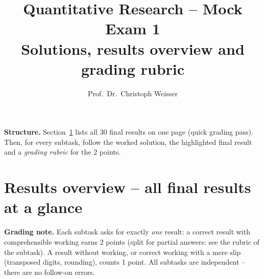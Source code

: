 \documentclass[11pt]{article}
\title{\vspace{-1.2cm}\textbf{Quantitative Research -- Mock Exam 1}\\[2pt]
\large Solutions, results overview and grading rubric}
\author{Prof.\ Dr.\ Christoph Weisser}
\date{}
\begin{document}
\maketitle
\thispagestyle{fancy}
\vspace{-0.7cm}

\noindent\small\textbf{Structure.} Section~\ref{sec:overview} lists all 30 final results
on one page (quick grading pass). Then, for every subtask, follow the worked solution, the
highlighted final result and a \emph{grading rubric} for the 2 points.\normalsize

\medskip

\vspace{-0.4cm}
\section{Results overview -- all final results at a glance}\label{sec:overview}

\begin{mistakebox}
\small\textbf{Grading note.} Each subtask asks for exactly \emph{one} result: a correct result
with comprehensible working earns 2 points (split for partial answers: see the rubric of the
subtask). A result without working, or correct working with a mere slip (transposed digits,
rounding), counts 1 point. All subtasks are independent -- there are no follow-on errors.
\end{mistakebox}
\end{document}
